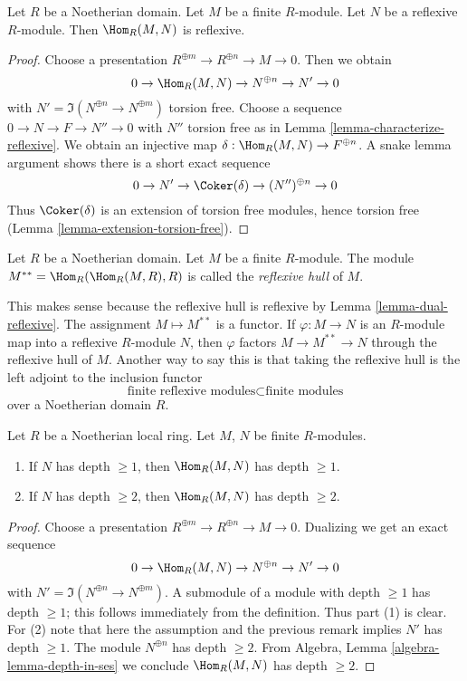 \begin{lemma}
\label{lemma-dual-reflexive}
Let $R$ be a Noetherian domain. Let $M$ be a finite $R$-module.
Let $N$ be a reflexive $R$-module. Then $\Hom_R(M, N)$ is reflexive.
\end{lemma}

\begin{proof}
Choose a presentation $R^{\oplus m} \to R^{\oplus n} \to M \to 0$.
Then we obtain
$$
0 \to \Hom_R(M, N) \to N^{\oplus n} \to N' \to 0
$$
with $N' = \Im(N^{\oplus n} \to N^{\oplus m})$ torsion free.
Choose a sequence $0 \to N \to F \to N'' \to 0$ with $N''$ torsion
free as in Lemma \ref{lemma-characterize-reflexive}. We obtain
an injective map $\delta : \Hom_R(M, N) \to F^{\oplus n}$.
A snake lemma argument shows there is a short exact sequence
$$
0 \to N' \to \Coker(\delta) \to (N'')^{\oplus n} \to 0
$$
Thus $\Coker(\delta)$ is an extension of torsion free modules,
hence torsion free (Lemma \ref{lemma-extension-torsion-free}).
\end{proof}

\begin{definition}
\label{definition-reflexive-hull}
Let $R$ be a Noetherian domain. Let $M$ be a finite $R$-module.
The module $M^{**} = \Hom_R(\Hom_R(M, R), R)$ is called the
{\it reflexive hull} of $M$.
\end{definition}

\noindent
This makes sense because the reflexive hull is reflexive by
Lemma \ref{lemma-dual-reflexive}. The assignment $M \mapsto M^{**}$
is a functor. If $\varphi : M \to N$ is an $R$-module map into a reflexive
$R$-module $N$, then $\varphi$ factors $M \to M^{**} \to N$
through the reflexive hull of $M$. Another way to say this is that
taking the reflexive hull is the left adjoint to the inclusion functor
$$
\text{finite reflexive modules} \subset
\text{finite modules}
$$
over a Noetherian domain $R$.

\begin{lemma}
\label{lemma-hom-into-depth}
Let $R$ be a Noetherian local ring. Let $M$, $N$ be finite $R$-modules.
\begin{enumerate}
\item If $N$ has depth $\geq 1$, then $\Hom_R(M, N)$ has depth $\geq 1$.
\item If $N$ has depth $\geq 2$, then $\Hom_R(M, N)$ has depth $\geq 2$.
\end{enumerate}
\end{lemma}

\begin{proof}
Choose a presentation $R^{\oplus m} \to R^{\oplus n} \to M \to 0$.
Dualizing we get an exact sequence
$$
0 \to \Hom_R(M, N) \to N^{\oplus n} \to N' \to 0
$$
with $N' = \Im(N^{\oplus n} \to N^{\oplus m})$. A submodule of a module
with depth $\geq 1$ has depth $\geq 1$; this follows immediately from
the definition. Thus part (1) is clear. For (2) note that here the
assumption and the previous remark implies $N'$ has depth $\geq 1$.
The module $N^{\oplus n}$ has depth $\geq 2$.
From Algebra, Lemma \ref{algebra-lemma-depth-in-ses}
we conclude $\Hom_R(M, N)$ has depth $\geq 2$.
\end{proof}

